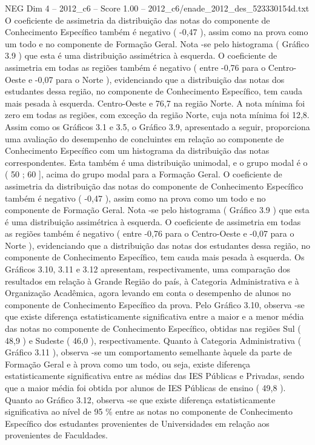 \begin{textsample}{NEG Dim 4 – 2012\_c6 – Score 1.00 – 2012\_c6/enade\_2012\_des\_523330154d.txt}
O coeficiente de assimetria da distribuição das notas do componente de Conhecimento Específico também é negativo ( -0,47 ), assim como na prova como um todo e no componente de Formação Geral.
Nota -se pelo histograma ( Gráfico 3.9 ) que esta é uma distribuição assimétrica à esquerda.
O coeficiente de assimetria em todas as regiões também é negativo ( entre -0,76 para o Centro-Oeste e -0,07 para o Norte ), evidenciando que a distribuição das notas dos estudantes dessa região, no componente de Conhecimento Específico, tem cauda mais pesada à esquerda.
Centro-Oeste e 76,7 na região Norte.
A nota mínima foi zero em todas as regiões, com exceção da região Norte, cuja nota mínima foi 12,8.
Assim como os Gráficos 3.1 e 3.5, o Gráfico 3.9, apresentado a seguir, proporciona uma avaliação do desempenho de concluintes em relação ao componente de Conhecimento Específico com um histograma da distribuição das notas correspondentes.
Esta também é uma distribuição unimodal, e o grupo modal é o ( 50 ; 60 ], acima do grupo modal para a Formação Geral.
O coeficiente de assimetria da distribuição das notas do componente de Conhecimento Específico também é negativo ( -0,47 ), assim como na prova como um todo e no componente de Formação Geral.
Nota -se pelo histograma ( Gráfico 3.9 ) que esta é uma distribuição assimétrica à esquerda.
O coeficiente de assimetria em todas as regiões também é negativo ( entre -0,76 para o Centro-Oeste e -0,07 para o Norte ), evidenciando que a distribuição das notas dos estudantes dessa região, no componente de Conhecimento Específico, tem cauda mais pesada à esquerda.
Os Gráficos 3.10, 3.11 e 3.12 apresentam, respectivamente, uma comparação dos resultados em relação à Grande Região do país, à Categoria Administrativa e à Organização Acadêmica, agora levando em conta o desempenho de alunos no componente de Conhecimento Específico da prova.
Pelo Gráfico 3.10, observa -se que existe diferença estatisticamente significativa entre a maior e a menor média das notas no componente de Conhecimento Específico, obtidas nas regiões Sul ( 48,9 ) e Sudeste ( 46,0 ), respectivamente.
Quanto à Categoria Administrativa ( Gráfico 3.11 ), observa -se um comportamento semelhante àquele da parte de Formação Geral e à prova como um todo, ou seja, existe diferença estatisticamente significativa entre as médias das IES Públicas e Privadas, sendo que a maior média foi obtida por alunos de IES Públicas de ensino ( 49,8 ).
Quanto ao Gráfico 3.12, observa -se que existe diferença estatisticamente significativa ao nível de 95 \% entre as notas no componente de Conhecimento Específico dos estudantes provenientes de Universidades em relação aos provenientes de Faculdades.

\end{textsample}

